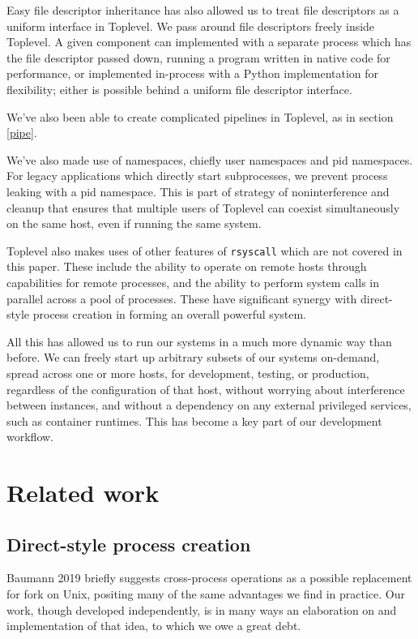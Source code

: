 \documentclass[letterpaper,twocolumn,10pt]{article}
\begin{document}
Easy file descriptor inheritance has also allowed us to treat file descriptors as a uniform interface in Toplevel.
We pass around file descriptors freely inside Toplevel.
A given component can implemented with a separate process which has the file descriptor passed down,
running a program written in native code for performance,
or implemented in-process with a Python implementation for flexibility;
either is possible behind a uniform file descriptor interface.

We've also been able to create complicated pipelines in Toplevel,
as in section \ref{pipe}.

We've also made use of namespaces,
chiefly user namespaces and pid namespaces.
For legacy applications which directly start subprocesses,
we prevent process leaking with a pid namespace.
This is part of strategy of noninterference and cleanup
that ensures that multiple users of Toplevel
can coexist simultaneously on the same host,
even if running the same system.

Toplevel also makes uses of other features of \texttt{rsyscall} which are not covered in this paper.
These include the ability to operate on remote hosts through capabilities for remote processes,
and the ability to perform system calls in parallel across a pool of processes.
These have significant synergy with direct-style process creation
in forming an overall powerful system.

All this has allowed us to run our systems in a much more dynamic way than before.
We can freely start up arbitrary subsets of our systems on-demand,
spread across one or more hosts,
for development, testing, or production,
regardless of the configuration of that host,
without worrying about interference between instances,
and without a dependency on any external privileged services,
such as container runtimes.
This has become a key part of our development workflow.
\section{Related work}\label{related_work}
\subsection{Direct-style process creation}
Baumann 2019\cite{forkroad} briefly suggests cross-process operations as a possible replacement for fork on Unix,
positing many of the same advantages we find in practice.
Our work, though developed independently,
is in many ways an elaboration on and implementation of that idea,
to which we owe a great debt.
\end{document}
